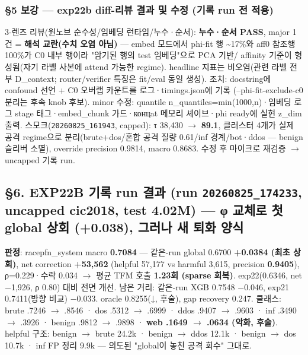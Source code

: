 \subsubsection{§5 보강 — exp22b diff-리뷰 결과 및 수정 (기록 run 전 적용)}
3-렌즈 리뷰(원노브 순수성/\allowbreak{}임베딩 런타임/\allowbreak{}누수·순서): \textbf{누수·순서 PASS}, major 1건 =\allowbreak{} \textbf{해석 교란(수치 오염 아님)} — embed 모드에서 phi-fit 행 \textasciitilde{}17\%와 aff0 참조행 100\%가 C0 내부 행이라 "암기된 행의 test 임베딩"으로 PCA 기반/\allowbreak{} affinity 기준이 형성됨(자기 라벨 사본에 attend 가능한 regime). headline 지표는 비오염(관련 라벨 전부 D\_\allowbreak{}context; router/\allowbreak{}verifier 특징은 fit/\allowbreak{}eval 동일 생성). 조치: docstring에 confound 선언 +\allowbreak{} C0 오버랩 카운트를 로그·timings.json에 기록 (--phi-fit-exclude-c0 분리는 후속 knob 후보). minor 수정: quantile n\_\allowbreak{}quantiles=\allowbreak{}min(1000,n)·임베딩 로그 stage 태그·embed\_\allowbreak{}chunk 가드·концat 메모리 셰이브·phi ready에 실현 z\_\allowbreak{}dim 출력. 스모크(\texttt{20260825\allowbreak{}\_\allowbreak{}\allowbreak{}161943}, capped): τ 38,430 \ensuremath{\rightarrow} \textbf{89.1}, 클러스터 4개가 실제 공격 regime으로 분리(brute+\allowbreak{}dos/\allowbreak{}혼합 공격 질량 0.61/\allowbreak{}inf 경계/\allowbreak{}bot·ddos — benign 슬리버 소멸), override precision 0.9814, macro 0.8683. 수정 후 마이크로 재검증  \ensuremath{\rightarrow}  uncapped 기록 run.

\subsection{§6. EXP22B 기록 run 결과 (run \texttt{20260825\allowbreak{}\_\allowbreak{}\allowbreak{}174233}, uncapped cic2018, test 4.02M) — \textbf{φ 교체로 첫 global 상회 (+\allowbreak{}0.038), 그러나 새 퇴화 양식}}
\textbf{판정}: racepfn\_\allowbreak{}system macro \textbf{0.7084} — 같은-run global 0.6700 \textbf{+\allowbreak{}0.0384 (최초 상회)}, net correction \textbf{+\allowbreak{}53,562} (helpful 57,177 vs harmful 3,615, precision \textbf{0.9405}), ρ=\allowbreak{}0.229·수락 0.034  \ensuremath{\rightarrow}  평균 TFM 호출 \textbf{1.23회 (sparse 회복)}. exp22(0.6346, net −1,926, ρ 0.80) 대비 전면 개선. 남은 거리: 같은-run XGB 0.7548 −0.046, exp21 0.7411(방향 비교) −0.033. oracle 0.8255(↓, 후술), gap recovery 0.247. 클래스: brute .7246 \ensuremath{\rightarrow} .8546 · dos .5312 \ensuremath{\rightarrow} .6999 · ddos .9407 \ensuremath{\rightarrow} .9603 · inf .3490 \ensuremath{\rightarrow} .3926 · benign .9812 \ensuremath{\rightarrow} .9898 · \textbf{web .1649 \ensuremath{\rightarrow} .0634 (악화, 후술)}. helpful 구조: benign \ensuremath{\rightarrow} brute 24.2k · benign \ensuremath{\rightarrow} ddos 12.1k · benign \ensuremath{\rightarrow} dos 10.7k · inf FP 정리 9.9k — 의도된 "global이 놓친 공격 회수" 그대로.

